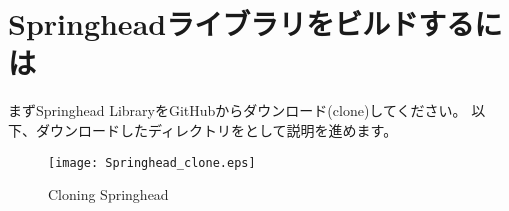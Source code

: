 \newpage
\section{Springheadライブラリをビルドするには}
\label{sec:HowToBuildLibaray}

\noindent
まずSpringhead LibraryをGitHubからダウンロード(clone)してください。
以下、ダウンロードしたディレクトリを\SprTop として説明を進めます。



\begin{landscape}
\begin{figure}[t]
\begin{center}
\texttt{[image: Springhead\_clone.eps]}
\end{center}
\caption{Cloning Springhead}
\label{fig_Springhead_clone}
\end{figure}
\end{landscape}


